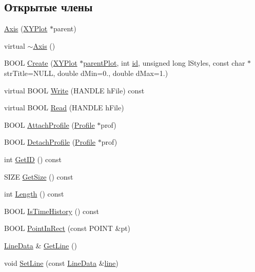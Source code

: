 \subsection*{Открытые члены}
\begin{DoxyCompactItemize}
\item 
\hyperlink{class_axis_abd42f819acb0ecb2875d7c5c0f6a90a2}{Axis} (\hyperlink{class_x_y_plot}{X\-Y\-Plot} $\ast$parent)
\item 
virtual \hyperlink{class_axis_a675ffe75a5e61a9e4f60bb79749d5e0c}{$\sim$\-Axis} ()
\item 
B\-O\-O\-L \hyperlink{class_axis_ad51bb24a3f0aa2a15b3d7255a4ad925d}{Create} (\hyperlink{class_x_y_plot}{X\-Y\-Plot} $\ast$\hyperlink{class_axis_a5bb30599723134e0d1250d6028a62575}{parent\-Plot}, int \hyperlink{class_axis_a12acb583f5bf5f386dc0ea78fa4461aa}{id}, unsigned long l\-Styles, const char $\ast$str\-Title=N\-U\-L\-L, double d\-Min=0., double d\-Max=1.)
\item 
virtual B\-O\-O\-L \hyperlink{class_axis_a895ec09817b379201fe2db2cd1e715aa}{Write} (H\-A\-N\-D\-L\-E h\-File) const 
\item 
virtual B\-O\-O\-L \hyperlink{class_axis_af403dc4181f1681d321f190bd74268ff}{Read} (H\-A\-N\-D\-L\-E h\-File)
\item 
B\-O\-O\-L \hyperlink{class_axis_a5c2b061f2d01872e9cda6e6be0c82f56}{Attach\-Profile} (\hyperlink{class_profile}{Profile} $\ast$prof)
\item 
B\-O\-O\-L \hyperlink{class_axis_a06230b1705046a15a4dddd3252a72691}{Detach\-Profile} (\hyperlink{class_profile}{Profile} $\ast$prof)
\item 
int \hyperlink{class_axis_ab169f9ad45fa8f790e24ee52f7a03996}{Get\-I\-D} () const 
\item 
S\-I\-Z\-E \hyperlink{class_axis_aac35b067fa0786b741627059741e53d3}{Get\-Size} () const 
\item 
int \hyperlink{class_axis_a62a3fedb305053a9cccde8cd34f73637}{Length} () const 
\item 
B\-O\-O\-L \hyperlink{class_axis_a3d3b29ba4d46db3ad1725566e4995e90}{Is\-Time\-History} () const 
\item 
B\-O\-O\-L \hyperlink{class_axis_aea4e6174866d246a5edc2a7b18cf72a4}{Point\-In\-Rect} (const P\-O\-I\-N\-T \&pt)
\item 
\hyperlink{class_line_data}{Line\-Data} \& \hyperlink{class_axis_a37d47434eb57a24e0bee36ac4314edfc}{Get\-Line} ()
\item 
void \hyperlink{class_axis_aa0ddf34c5b437423f1f85c51a54d5239}{Set\-Line} (const \hyperlink{class_line_data}{Line\-Data} \&\hyperlink{class_axis_a68817bcf5ea38ff2d81698175ae9c6ee}{line})

\end{DoxyCompactItemize}
